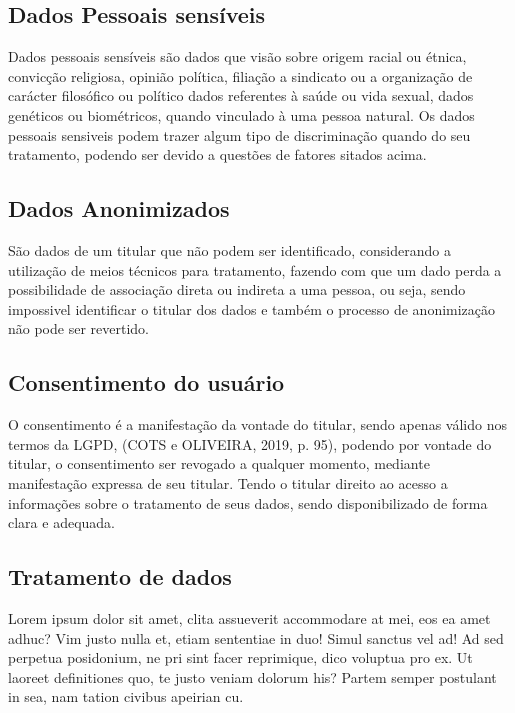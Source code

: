 \documentclass[
	12pt,				%
	openright,			%
	oneside,			%
	a4paper,			%
	english,			%
	french,				%
	spanish,			%
	brazil,				%
	]{abntex2}
\begin{document}
\subsection{Dados Pessoais sensíveis}

Dados pessoais sensíveis são dados que visão sobre origem racial ou étnica, convicção religiosa, opinião política, filiação a sindicato ou a organização de carácter filosófico ou político dados referentes à saúde ou vida sexual, dados genéticos ou biométricos, quando vinculado à uma pessoa natural.
Os dados pessoais sensiveis podem trazer algum tipo de discriminação quando do seu tratamento, podendo ser devido a questões de fatores sitados acima.



\subsection{Dados Anonimizados}

São dados de um titular que não podem ser identificado, considerando a utilização de meios técnicos para tratamento, fazendo com que um dado perda a possibilidade de associação direta ou indireta a uma pessoa, ou seja, sendo impossivel identificar o titular dos dados e também o processo de anonimização não pode ser revertido.

\subsection{Consentimento do usuário}

O consentimento é a manifestação da vontade do titular, sendo apenas válido nos termos da LGPD, (COTS e OLIVEIRA, 2019, p. 95), podendo por vontade do titular, o consentimento ser revogado a qualquer momento, mediante manifestação expressa de seu titular. Tendo o titular direito ao acesso a informações sobre o tratamento de seus dados, sendo disponibilizado de forma clara e adequada.


\subsection{Tratamento de dados}

Lorem ipsum dolor sit amet, clita assueverit accommodare at mei, eos ea amet adhuc? Vim justo nulla et, etiam sententiae in duo! Simul sanctus vel ad! Ad sed perpetua posidonium, ne pri sint facer reprimique, dico voluptua pro ex. Ut laoreet definitiones quo, te justo veniam dolorum his? Partem semper postulant in sea, nam tation civibus apeirian cu.
\end{document}

